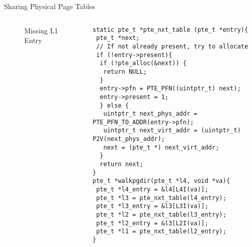 \documentclass[aspectratio=169,xcolor=dvipsnames]{beamer}
\begin{document}
\begin{frame}[fragile]{Sharing Physical Page Tables}
\begin{columns}[c]
\begin{figure}
\begin{tikzpicture}[x=0.75pt,y=0.75pt,yscale=-0.5,xscale=0.5]
\end{tikzpicture}
        \caption{Missing L1 Entry}
        \label{fig:enter-label}
    \end{figure}
\begin{lstlisting}[style=CStyleNum, basicstyle=\tiny]
static pte_t *pte_nxt_table (pte_t *entry){
 pte_t *next;
 // If not already present, try to allocate
 if (!entry->present){
  if (!pte_alloc(&next)) {
   return NULL;
  }
  entry->pfn = PTE_PFN((uintptr_t) next);
  entry->present = 1;
  } else {
   uintptr_t next_phys_addr = PTE_PFN_TO_ADDR(entry->pfn);        
   uintptr_t next_virt_addr = (uintptr_t) P2V(next_phys_addr);
   next = (pte_t *) next_virt_addr;
  }
  return next;
}   
pte_t *walkpgdir(pte_t *l4, void *va){ 
 pte_t *l4_entry = &l4[L4I(va)];
 pte_t *l3 = pte_nxt_table(l4_entry);
 pte_t *l3_entry = &l3[L3I(va)];
 pte_t *l2 = pte_nxt_table(l3_entry);
 pte_t *l2_entry = &l3[L2I(va)];  
 pte_t *l1 = pte_nxt_table(l2_entry);
}

\end{lstlisting}
\end{columns}
\end{frame}
\end{document}
